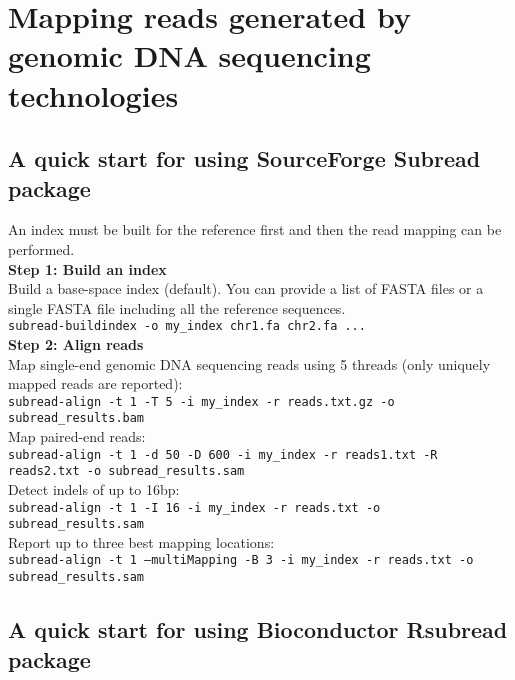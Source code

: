 \documentclass[12pt]{report}
\newcommand{\code}[1]{{\small\texttt{#1}}}
\newcommand{\Subread}{\textsf{Subread}}
\newcommand{\Rsubread}{\textsf{Rsubread}}
\begin{document}
\chapter{Mapping reads generated by genomic DNA sequencing technologies}
\label{chapter:subread-dnaseq}

\section{A quick start for using SourceForge {\Subread} package}

An index must be built for the reference first and then the read mapping can be performed.\\

{\noindent\bf Step 1: Build an index}\\

\noindent Build a base-space index (default). You can provide a list of FASTA files or a single FASTA file including all the reference sequences.\\

\code{subread-buildindex -o my\_index chr1.fa chr2.fa ...}\\

{\noindent\bf Step 2: Align reads}\\

\noindent Map single-end genomic DNA sequencing reads using 5 threads (only uniquely mapped reads are reported):\\
\code{subread-align -t 1 -T 5 -i my\_index -r reads.txt.gz -o subread\_results.bam}\\

\noindent Map paired-end reads:\\
\code{subread-align -t 1 -d 50 -D 600 -i my\_index -r reads1.txt -R reads2.txt \newline -o subread\_results.sam}\\

\noindent Detect indels of up to 16bp:\\
\code{subread-align -t 1 -I 16 -i my\_index -r reads.txt -o subread\_results.sam}\\

\noindent Report up to three best mapping locations:\\
\code{subread-align -t 1 --multiMapping -B 3 -i my\_index -r reads.txt -o subread\_results.sam}\\


\section{A quick start for using Bioconductor {\Rsubread} package}
\end{document}
